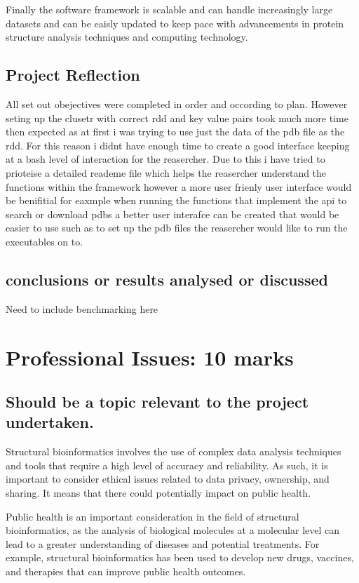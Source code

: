 \documentclass[]{final_report}
\begin{document}
Finally the software framework is scalable and can handle increasingly large datasets and can be eaisly updated to keep pace with advancements in protein structure analysis techniques and computing technology.

\subsection{Project Reflection}

All set out obejectives were completed in order and occording to plan. However seting up the clusetr with correct rdd and key value pairs took much more time then expected as at first i was trying to use just the data of the pdb file as the rdd. For this reason i didnt have enough time to create a good interface keeping at a bash level of interaction for the reasercher. Due to this i have tried to prioteise a detailed reademe file which helps the reasercher understand the functions within the framework however a more user frienly user interface would be benifitial for eaxmple when running the functions that implement the api to search or download pdbs a better user interafce can be created that would be easier to use such as to set up the pdb files the reasercher would like to run the executables on to.

\subsection{conclusions or results analysed or discussed}
Need to include benchmarking here

\section{Professional Issues: 10 marks}
\subsection{Should be a topic relevant to the project undertaken.}
Structural bioinformatics involves the use of complex data analysis techniques and tools that require a high level of accuracy and reliability. As such, it is important to consider ethical issues related to data privacy, ownership, and sharing. It means that there could potentially impact on public health.

Public health is an important consideration in the field of structural bioinformatics, as the analysis of biological molecules at a molecular level can lead to a greater understanding of diseases and potential treatments. For example, structural bioinformatics has been used to develop new drugs, vaccines, and therapies that can improve public health outcomes.
\end{document}
